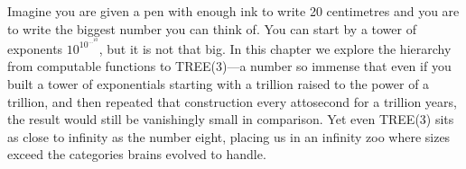 Imagine you are given a pen with enough ink to write 20 centimetres and you are to write the biggest number you can think of. You can start by a tower of exponents $10^{10^{\cdots^{10}}}$, but it is not that big. In this chapter we explore the hierarchy from computable functions to TREE(3)—a number so immense that even if you built a tower of exponentials starting with a trillion raised to the power of a trillion, and then repeated that construction every attosecond for a trillion years, the result would still be vanishingly small in comparison. Yet even TREE(3) sits as close to infinity as the number eight, placing us in an infinity zoo where sizes exceed the categories brains evolved to handle.
